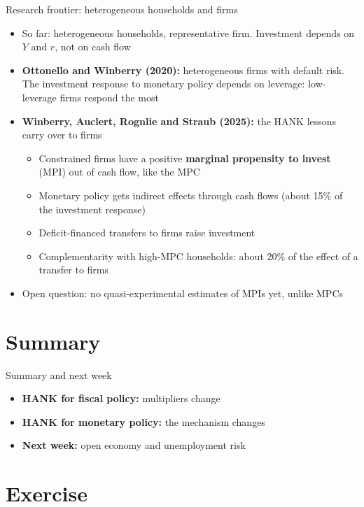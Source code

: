 \documentclass[10pt,english]{beamer}
\begin{document}
\begin{frame}{Research frontier: heterogeneous households and firms}
\begin{itemize}
\item <+->So far: heterogeneous households, representative firm. Investment depends on $Y$ and $r$, not on cash flow
\item <+->\textbf{Ottonello and Winberry (2020):} heterogeneous firms with default risk. The investment response to monetary policy depends on leverage: low-leverage firms respond the most
\item <+->\textbf{Winberry, Auclert, Rognlie and Straub (2025):} the HANK lessons carry over to firms
\begin{itemize}
\item Constrained firms have a positive \textbf{marginal propensity to invest} (MPI) out of cash flow, like the MPC
\item Monetary policy gets indirect effects through cash flows (about 15\% of the investment response)
\item Deficit-financed transfers to firms raise investment
\item Complementarity with high-MPC households: about 20\% of the effect of a transfer to firms
\end{itemize}
\item <+->Open question: no quasi-experimental estimates of MPIs yet, unlike MPCs
\end{itemize}
\end{frame}
%

\section{Summary}

\begin{frame}{Summary and next week}
\begin{itemize}
\item <+->\textbf{HANK for fiscal policy:} multipliers change
\item <+->\textbf{HANK for monetary policy:} the mechanism changes
\item <+->\textbf{Next week:} open economy and unemployment risk
\end{itemize}
\end{frame}
%

\section{Exercise}
\end{document}
